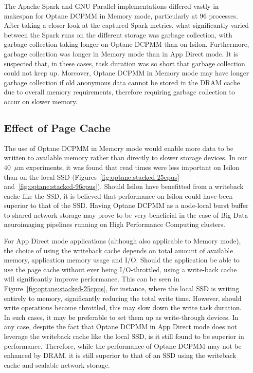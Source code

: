 The Apache Spark and GNU Parallel implementations differed vastly in makespan
for Optane DCPMM in Memory mode, particularly at 96 processes. After taking a
closer look at the captured Spark metrics, what significantly varied between the
Spark runs on the different storage was garbage collection, with garbage
collection taking longer on Optane DCPMM than on Isilon. Furthermore, garbage
collection was longer in Memory mode than in App Direct mode. It is suspected
that, in these cases, task duration was so short that garbage collection could
not keep up. Moreover, Optane DCPMM in Memory mode may have longer garbage
collection if old anonymous data cannot be stored in the DRAM cache due to
overall memory requirements, therefore requiring garbage collection to occur on
slower memory.

\subsection{Effect of Page Cache}

The use of Optane DCPMM in Memory mode would enable more data to be written to
available memory rather than directly to slower storage devices. In our
40~$\mu$m \bigbrain experiments, it was found that read times were less
important on Isilon than on the local SSD (Figures~\ref{fig:optane:stacked-25cpus}
and~\ref{fig:optane:stacked-96cpus}). Should Isilon have benefitted from a writeback
cache like the SSD, it is believed that performance on Isilon could have been
superior to that of the SSD. Having Optane DCPMM as a node-local burst buffer to
shared network storage may prove to be very beneficial in the case of Big Data
neuroimaging pipelines running on High Performance Computing clusters.

For App Direct mode applications (although also applicable to Memory mode), the
choice of using the writeback cache depends on total amount of available memory,
application memory usage and I/O. Should the application be able to use the page
cache without ever being I/O-throttled, using a write-back cache will
significantly improve performance. This can be seen in
Figure~\ref{fig:optane:stacked-25cpus}, for instance, where the local SSD is writing
entirely to memory, significantly reducing the total write time. However, should
write operations become throttled, this may slow down the write task duration.
In such cases, it may be preferable to set them up as write-through devices. In
any case, despite the fact that Optane DCPMM in App Direct mode does not
leverage the writeback cache like the local SSD, is it still found to be
superior in performance. Therefore, while the performance of Optane DCPMM may
not be enhanced by DRAM, it is still superior to that of an SSD using the
writeback cache and scalable network storage.

